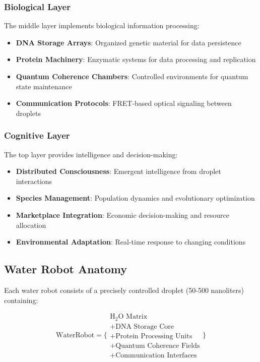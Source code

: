 \documentclass[11pt,a4paper]{article}
\begin{document}
\subsubsection{Biological Layer}
The middle layer implements biological information processing:

\begin{itemize}
    \item \textbf{DNA Storage Arrays}: Organized genetic material for data persistence
    \item \textbf{Protein Machinery}: Enzymatic systems for data processing and replication
    \item \textbf{Quantum Coherence Chambers}: Controlled environments for quantum state maintenance
    \item \textbf{Communication Protocols}: FRET-based optical signaling between droplets
\end{itemize}

\subsubsection{Cognitive Layer}
The top layer provides intelligence and decision-making:

\begin{itemize}
    \item \textbf{Distributed Consciousness}: Emergent intelligence from droplet interactions
    \item \textbf{Species Management}: Population dynamics and evolutionary optimization
    \item \textbf{Marketplace Integration}: Economic decision-making and resource allocation
    \item \textbf{Environmental Adaptation}: Real-time response to changing conditions
\end{itemize}

\subsection{Water Robot Anatomy}

Each water robot consists of a precisely controlled droplet (50-500 nanoliters) containing:

\begin{equation}
\text{WaterRobot} = \{
\begin{array}{l}
\text{H}_2\text{O Matrix} \\
+ \text{DNA Storage Core} \\
+ \text{Protein Processing Units} \\
+ \text{Quantum Coherence Fields} \\
+ \text{Communication Interfaces}
\end{array}
\}
\end{equation}
\end{document}
